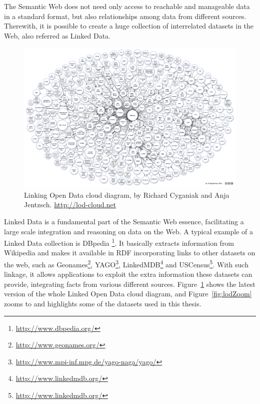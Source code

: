 The Semantic Web does not need only access to reachable and manageable data in a standard format, but also
relationships among data from different sources. Therewith, it is possible to create a huge collection of interrelated
datasets in the Web, also referred as Linked Data.

\begin{figure}[h!]
\begin{center}
  \includegraphics[width=1\linewidth]{./Figures/lod-datasets_2011-09-19.png}
\end{center}
\caption{Linking Open Data cloud diagram, by Richard Cyganiak and Anja Jentzsch. \url{http://lod-cloud.net}}
\label{fig:lod}
\end{figure}

Linked Data is a fundamental part of the Semantic Web essence, facilitating a large scale integration and reasoning
on data on the Web. A typical example of a Linked Data collection is DBpedia
{\footnote{\url{http://www.dbpedia.org/}}}. It basically extracts information from Wikipedia and
makes it available in RDF incorporating links to other datasets on the web, such as 
Geonames\footnote{\url{http://www.geonames.org/}},
YAGO\footnote{\url{http://www.mpi-inf.mpg.de/yago-naga/yago/}}, 
LinkedMDB\footnote{\url{http://www.linkedmdb.org/}} and 
USCensus\footnote{\url{http://www.linkedmdb.org/}}. 
With such linkage, it allows
applications to exploit the extra information these datasets can provide, integrating facts from various different
sources. Figure~\ref{fig:lod} shows the latest version of the whole Linked Open Data cloud
diagram, and Figure~\ref{fig:lodZoom} zooms to and highlights some of the datasets used in this thesis.

